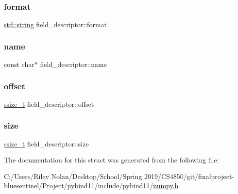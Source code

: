 \subsubsection{\texorpdfstring{format}{format}}
{\footnotesize\ttfamily \mbox{\hyperlink{_s_d_l__opengl__glext_8h_ab4ccfaa8ab0e1afaae94dc96ef52dde1}{std\+::string}} field\+\_\+descriptor\+::format}

\mbox{\label{structfield__descriptor_a2b8d0e45646daa97e6730819f5556c12}} 
\subsubsection{\texorpdfstring{name}{name}}
{\footnotesize\ttfamily const char$\ast$ field\+\_\+descriptor\+::name}

\mbox{\label{structfield__descriptor_a3b43f6fd295c953e0dc7284d042b9dbf}} 
\subsubsection{\texorpdfstring{offset}{offset}}
{\footnotesize\ttfamily \mbox{\hyperlink{detail_2common_8h_ac430d16fc097b3bf0a7469cfd09decda}{ssize\+\_\+t}} field\+\_\+descriptor\+::offset}

\mbox{\label{structfield__descriptor_ab74ae9e9a3dc6856c5a839abc26c108b}} 
\subsubsection{\texorpdfstring{size}{size}}
{\footnotesize\ttfamily \mbox{\hyperlink{detail_2common_8h_ac430d16fc097b3bf0a7469cfd09decda}{ssize\+\_\+t}} field\+\_\+descriptor\+::size}



The documentation for this struct was generated from the following file\+:\begin{DoxyCompactItemize}
\item 
C\+:/\+Users/\+Riley Nolan/\+Desktop/\+School/\+Spring 2019/\+C\+S4850/git/finalproject-\/bluesentinel/\+Project/pybind11/include/pybind11/\mbox{\hyperlink{numpy_8h}{numpy.\+h}}\end{DoxyCompactItemize}
